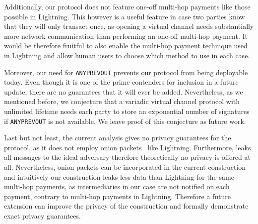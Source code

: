  Additionally, our protocol does not feature one-off multi-hop payments like
  those possible in Lightning. This however is a useful feature in case two
  parties know that they will only transact once, as opening a virtual channel
  needs substantially more network communication than performing an one-off
  multi-hop payment. It would be therefore fruitful to also enable the multi-hop
  payment technique used in Lightning and allow human users to choose which
  method to use in each case.

  Moreover, our need for \texttt{ANYPREVOUT} prevents our protocol from being
  deployable today. Even though it is one of the prime contenders for inclusion
  in a future update, there are no guarantees that it will ever be added.
  Nevertheless, as we mentioned before, we conjecture that a variadic virtual
  channel protocol with unlimited lifetime needs each party to store an
  exponential number of signatures if \texttt{ANYPREVOUT} is not available. We
  leave proof of this conjecture as future work.

  Last but not least, the current analysis gives no privacy guarantees for the
  protocol, as it does not employ onion packets~\cite{sphinx} like Lightning.
  Furthermore, \fchan leaks all messages to the ideal adversary therefore
  theoretically no privacy is offered at all. Nevertheless, onion packets can be
  incorporated in the current construction and intuitively our construction
  leaks less data than Lightning for the same multi-hop payments, as
  intermediaries in our case are not notified on each payment, contrary to
  multi-hop payments in Lightning. Therefore a future extension can improve the
  privacy of the construction and formally demonstrate exact privacy guarantees.
